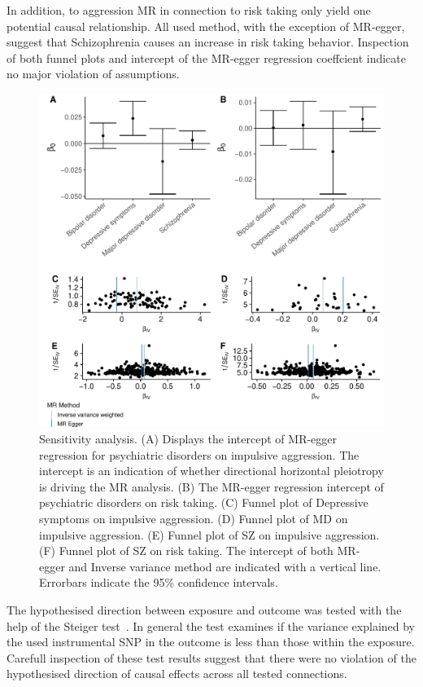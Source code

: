 In addition, to aggression MR in connection to risk taking only yield one potential causal relationship.
All used method, with the exception of MR-egger, suggest that Schizophrenia causes an increase in risk taking behavior.
Inspection of both funnel plots and intercept of the MR-egger regression coeffcient indicate no major violation of assumptions.

\begin{figure}[htpb]
  \centering
  \includegraphics[width=0.9\linewidth]{figures/sensitvity_plot.pdf}
  \caption{Sensitivity analysis.
    (A) Displays the intercept of MR-egger regression for psychiatric disorders on impulsive aggression. The intercept is an indication of whether directional horizontal pleiotropy is driving the MR analysis.
    (B) The MR-egger regression intercept of psychiatric disorders on risk taking.
    (C) Funnel plot of Depressive symptoms on impulsive aggression. 
    (D) Funnel plot of MD on impulsive aggression. 
    (E) Funnel plot of SZ on impulsive aggression. 
    (F) Funnel plot of SZ on risk taking. 
    The intercept of both MR-egger and Inverse variance method are indicated with a vertical line.
    Errorbars indicate the 95\% confidence intervals.
  }\label{fig:sensitivity}
\end{figure}

The hypothesised direction between exposure and outcome was tested with the help of the Steiger test~\cite{Steiger1980}.
In general the test examines if the variance explained by the used instrumental SNP in the outcome is less than those within the exposure. 
Carefull inspection of these test results suggest that there were no violation of the hypothesised direction of causal effects across all tested connections.

